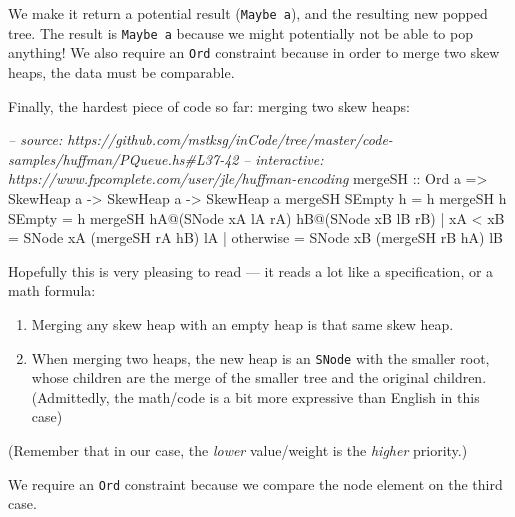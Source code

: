 \documentclass[]{article}
\newenvironment{Shaded}{\begin{snugshade}}{\end{snugshade}}
\newcommand{\CommentTok}[1]{\textcolor[rgb]{0.56,0.35,0.01}{\textit{#1}}}
\newcommand{\DataTypeTok}[1]{\textcolor[rgb]{0.13,0.29,0.53}{#1}}
\newcommand{\FunctionTok}[1]{\textcolor[rgb]{0.00,0.00,0.00}{#1}}
\newcommand{\NormalTok}[1]{#1}
\newcommand{\OtherTok}[1]{\textcolor[rgb]{0.56,0.35,0.01}{#1}}
\begin{document}
We make it return a potential result (\texttt{Maybe\ a}), and the resulting new
popped tree. The result is \texttt{Maybe\ a} because we might potentially not be
able to pop anything! We also require an \texttt{Ord} constraint because in
order to merge two skew heaps, the data must be comparable.

Finally, the hardest piece of code so far: merging two skew heaps:

\begin{Shaded}
\begin{Highlighting}[]
\CommentTok{-- source: https://github.com/mstksg/inCode/tree/master/code-samples/huffman/PQueue.hs#L37-42}
\CommentTok{-- interactive: https://www.fpcomplete.com/user/jle/huffman-encoding}
\OtherTok{mergeSH ::} \DataTypeTok{Ord}\NormalTok{ a }\OtherTok{=>} \DataTypeTok{SkewHeap}\NormalTok{ a }\OtherTok{->} \DataTypeTok{SkewHeap}\NormalTok{ a }\OtherTok{->} \DataTypeTok{SkewHeap}\NormalTok{ a}
\NormalTok{mergeSH }\DataTypeTok{SEmpty}\NormalTok{ h }\FunctionTok{=}\NormalTok{ h}
\NormalTok{mergeSH h }\DataTypeTok{SEmpty} \FunctionTok{=}\NormalTok{ h}
\NormalTok{mergeSH hA}\FunctionTok{@}\NormalTok{(}\DataTypeTok{SNode}\NormalTok{ xA lA rA) hB}\FunctionTok{@}\NormalTok{(}\DataTypeTok{SNode}\NormalTok{ xB lB rB)}
    \FunctionTok{|}\NormalTok{ xA }\FunctionTok{<}\NormalTok{ xB    }\FunctionTok{=} \DataTypeTok{SNode}\NormalTok{ xA (mergeSH rA hB) lA}
    \FunctionTok{|}\NormalTok{ otherwise  }\FunctionTok{=} \DataTypeTok{SNode}\NormalTok{ xB (mergeSH rB hA) lB}
\end{Highlighting}
\end{Shaded}

Hopefully this is very pleasing to read --- it reads a lot like a specification,
or a math formula:

\begin{enumerate}
\def\labelenumi{\arabic{enumi}.}
\tightlist
\item
  Merging any skew heap with an empty heap is that same skew heap.
\item
  When merging two heaps, the new heap is an \texttt{SNode} with the smaller
  root, whose children are the merge of the smaller tree and the original
  children. (Admittedly, the math/code is a bit more expressive than English in
  this case)
\end{enumerate}

(Remember that in our case, the \emph{lower} value/weight is the \emph{higher}
priority.)

We require an \texttt{Ord} constraint because we compare the node element on the
third case.
\end{document}
